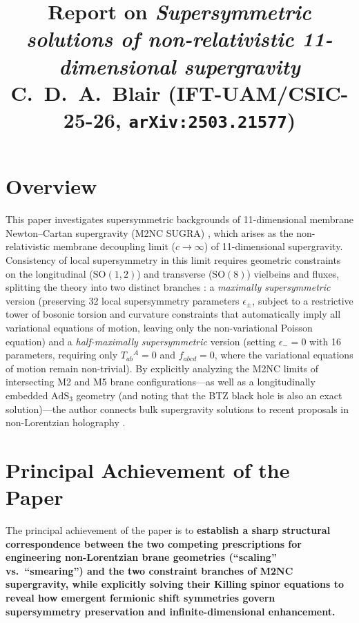 \documentclass[11pt]{article}
\title{\vspace{-1.4cm}\textbf{Report on \textit{Supersymmetric solutions of non-relativistic 11-dimensional supergravity}}\\[4pt]
\normalsize C.~D.~A.~Blair (IFT-UAM/CSIC-25-26, \texttt{arXiv:2503.21577}) \cite{Blair:2025susy}}
\author{}
\date{}
\begin{document}
\maketitle
\vspace{-1.4cm}

\section*{Overview}
This paper investigates supersymmetric backgrounds of 11-dimensional membrane Newton--Cartan supergravity (M2NC SUGRA) \cite{Blair:2021waq,Bergshoeff:2024nin}, which arises as the non-relativistic membrane decoupling limit ($c \to \infty$) of 11-dimensional supergravity. Consistency of local supersymmetry in this limit requires geometric constraints on the longitudinal ($\mathrm{SO}(1,2)$) and transverse ($\mathrm{SO}(8)$) vielbeins and fluxes, splitting the theory into two distinct branches \cite{Bergshoeff:2024nin}: a \emph{maximally supersymmetric} version (preserving 32 local supersymmetry parameters $\epsilon_\pm$, subject to a restrictive tower of bosonic torsion and curvature constraints that automatically imply all variational equations of motion, leaving only the non-variational Poisson equation) and a \emph{half-maximally supersymmetric} version (setting $\epsilon_- = 0$ with 16 parameters, requiring only $T_{ab}{}^A = 0$ and $f_{abcd} = 0$, where the variational equations of motion remain non-trivial). By explicitly analyzing the M2NC limits of intersecting M2 and M5 brane configurations---as well as a longitudinally embedded $\mathrm{AdS}_3$ geometry (and noting that the BTZ black hole is also an exact solution)---the author connects bulk supergravity solutions to recent proposals in non-Lorentzian holography \cite{Lambert:2024uue,Lambert:2024yjk,Fontanella:2024rvn,Fontanella:2024kyl,Blair:2024aqz,Lambert:2024ncn,Harmark:2025ikv}.

\section{Principal Achievement of the Paper}
The principal achievement of the paper is to \textbf{establish a sharp structural correspondence between the two competing prescriptions for engineering non-Lorentzian brane geometries (``scaling'' vs.\ ``smearing'') and the two constraint branches of M2NC supergravity, while explicitly solving their Killing spinor equations to reveal how emergent fermionic shift symmetries govern supersymmetry preservation and infinite-dimensional enhancement.}
\end{document}
